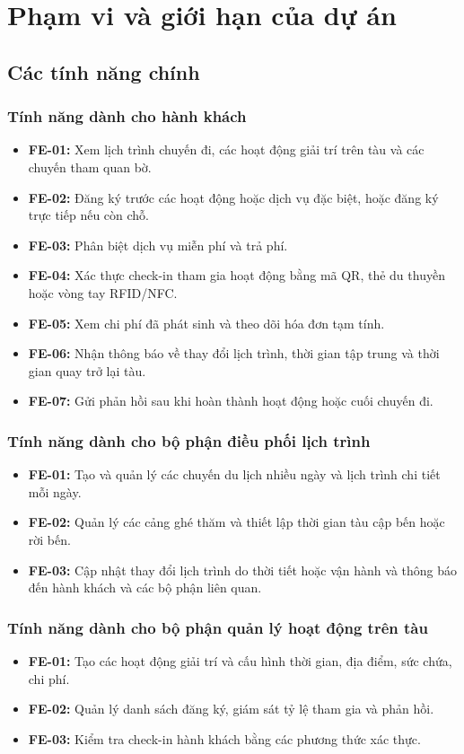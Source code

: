 \section{Phạm vi và giới hạn của dự án}
\subsection{Các tính năng chính}

\subsubsection{Tính năng dành cho hành khách}
\begin{itemize}
    \item \textbf{FE-01:} Xem lịch trình chuyến đi, các hoạt động giải trí trên tàu và các chuyến tham quan bờ.
    \item \textbf{FE-02:} Đăng ký trước các hoạt động hoặc dịch vụ đặc biệt, hoặc đăng ký trực tiếp nếu còn chỗ.
    \item \textbf{FE-03:} Phân biệt dịch vụ miễn phí và trả phí.
    \item \textbf{FE-04:} Xác thực check-in tham gia hoạt động bằng mã QR, thẻ du thuyền hoặc vòng tay RFID/NFC.
    \item \textbf{FE-05:} Xem chi phí đã phát sinh và theo dõi hóa đơn tạm tính.
    \item \textbf{FE-06:} Nhận thông báo về thay đổi lịch trình, thời gian tập trung và thời gian quay trở lại tàu.
    \item \textbf{FE-07:} Gửi phản hồi sau khi hoàn thành hoạt động hoặc cuối chuyến đi.
\end{itemize}

\subsubsection{Tính năng dành cho bộ phận điều phối lịch trình}
\begin{itemize}
    \item \textbf{FE-01:} Tạo và quản lý các chuyến du lịch nhiều ngày và lịch trình chi tiết mỗi ngày.
    \item \textbf{FE-02:} Quản lý các cảng ghé thăm và thiết lập thời gian tàu cập bến hoặc rời bến.
    \item \textbf{FE-03:} Cập nhật thay đổi lịch trình do thời tiết hoặc vận hành và thông báo đến hành khách và các bộ phận liên quan.
\end{itemize}

\subsubsection{Tính năng dành cho bộ phận quản lý hoạt động trên tàu}
\begin{itemize}
    \item \textbf{FE-01:} Tạo các hoạt động giải trí và cấu hình thời gian, địa điểm, sức chứa, chi phí.
    \item \textbf{FE-02:} Quản lý danh sách đăng ký, giám sát tỷ lệ tham gia và phản hồi.
    \item \textbf{FE-03:} Kiểm tra check-in hành khách bằng các phương thức xác thực.
\end{itemize}

